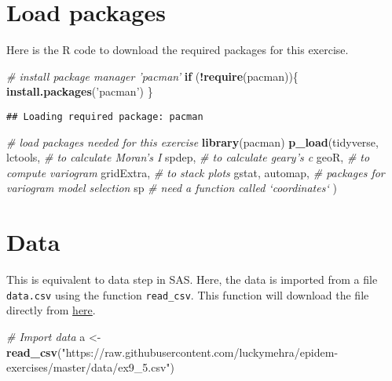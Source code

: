 \documentclass[]{book}
\newenvironment{Shaded}{\begin{snugshade}}{\end{snugshade}}
\newcommand{\CommentTok}[1]{\textcolor[rgb]{0.56,0.35,0.01}{\textit{#1}}}
\newcommand{\ControlFlowTok}[1]{\textcolor[rgb]{0.13,0.29,0.53}{\textbf{#1}}}
\newcommand{\KeywordTok}[1]{\textcolor[rgb]{0.13,0.29,0.53}{\textbf{#1}}}
\newcommand{\NormalTok}[1]{#1}
\newcommand{\OperatorTok}[1]{\textcolor[rgb]{0.81,0.36,0.00}{\textbf{#1}}}
\newcommand{\StringTok}[1]{\textcolor[rgb]{0.31,0.60,0.02}{#1}}
\begin{document}
\hypertarget{load-packages-2}{%
\section{Load packages}\label{load-packages-2}}

Here is the R code to download the required packages for this exercise.

\begin{Shaded}
\begin{Highlighting}[]
\CommentTok{# install package manager 'pacman'}
\ControlFlowTok{if}\NormalTok{ (}\OperatorTok{!}\KeywordTok{require}\NormalTok{(pacman))\{}
  \KeywordTok{install.packages}\NormalTok{(}\StringTok{'pacman'}\NormalTok{)}
\NormalTok{\}}
\end{Highlighting}
\end{Shaded}

\begin{verbatim}
## Loading required package: pacman
\end{verbatim}

\begin{Shaded}
\begin{Highlighting}[]
\CommentTok{# load packages needed for this exercise}
\KeywordTok{library}\NormalTok{(pacman)}
\KeywordTok{p_load}\NormalTok{(tidyverse,}
\NormalTok{       lctools, }\CommentTok{# to calculate Moran's I}
\NormalTok{       spdep, }\CommentTok{# to calculate geary's c}
\NormalTok{       geoR, }\CommentTok{# to compute variogram}
\NormalTok{       gridExtra, }\CommentTok{# to stack plots}
\NormalTok{       gstat, automap, }\CommentTok{# packages for variogram model selection}
\NormalTok{       sp }\CommentTok{# need a function called `coordinates`}
\NormalTok{       )}
\end{Highlighting}
\end{Shaded}

\hypertarget{data-1}{%
\section{Data}\label{data-1}}

This is equivalent to data step in SAS. Here, the data is imported from a file \texttt{data.csv} using the function \texttt{read\_csv}. This function will download the file directly from \href{https://raw.githubusercontent.com/luckymehra/epidem-exercises/master/data/ex9_5.csv}{here}.

\begin{Shaded}
\begin{Highlighting}[]
\CommentTok{# Import data}
\NormalTok{a <-}\StringTok{ }\KeywordTok{read_csv}\NormalTok{(}\StringTok{"https://raw.githubusercontent.com/luckymehra/epidem-exercises/master/data/ex9_5.csv"}\NormalTok{)}
\end{Highlighting}
\end{Shaded}
\end{document}
